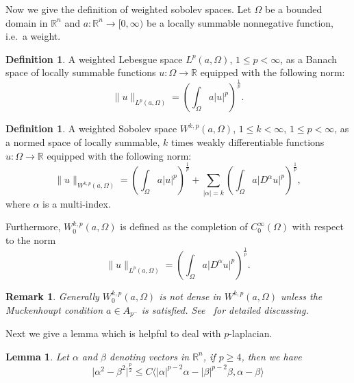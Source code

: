 \documentclass[11pt]{amsart}
\newtheorem{lemma}[theorem]{Lemma}
\newtheorem{remark}[theorem]{Remark}
\theoremstyle{definition}
\newtheorem{definition}[theorem]{Definition}
\numberwithin{equation}{section}
\newcommand*\abs[1]{\lvert#1\rvert}
\newcommand*\norm[1]{\lVert#1\rVert}
\newcommand\R{\mathbb{R}}
\begin{document}
Now we give the definition of weighted sobolev spaces.
Let $\Omega$ be a bounded domain in $\R^n$ and
$a \colon \R^n \to [0, \infty)$
be a locally summable nonnegative function, i.e.\ a weight.
\begin{definition}
	A weighted Lebesgue space $L^p(a, \Omega)$, $1 \leq p < \infty$,
	as a Banach space of locally summable functions
	$u \colon \Omega \to \R$ equipped with the following norm:
	\begin{equation}
		\norm{u}_{L^p(a,\Omega)} =
		\left( \int_{\Omega}a\abs{u}^p \right)^{\frac{1}{p}}.
	\end{equation}
\end{definition}
\begin{definition}
	A weighted Sobolev space $W^{k,p}(a,\Omega)$,
	$1 \leq k < \infty$, $1 \leq p < \infty$,
	as a normed space of locally summable, $k$ times weakly
	differentiable functions $u \colon \Omega \to \R$ equipped with the following norm:
	\begin{equation}
		\norm{u}_{W^{k,p}(a,\Omega)} =
		\left( \int_{\Omega}a\abs{u}^p \right)^{\frac{1}{p}}
		+ \sum_{\abs{\alpha}=k}
		\left( \int_{\Omega}a\abs{D^{\alpha}u}^p \right)^{\frac{1}{p}},
	\end{equation}
	where $\alpha$ is a multi-index.
	
	Furthermore,
	$W_0^{k,p}(a,\Omega)$ is defined as the completion of
	$C_0^{\infty}(\Omega)$ with respect to the norm
	\begin{equation}
		\norm{u}_{L^p(a,\Omega)} =
		\left( \int_{\Omega}a\abs{D^{\alpha}u}^p \right)^{\frac{1}{p}}.
	\end{equation}
\end{definition}
\begin{remark}
	Generally $W_0^{k,p}(a,\Omega)$ is not dense in
	$W^{k,p}(a,\Omega)$ unless the Muckenhoupt condition $a \in A_{p^-}$ is satisfied. See~\cite{goldshteinWeightedSobolevSpaces2009} for detailed discussing.
\end{remark}
Next we give a lemma which is helpful to deal with $p$-laplacian.
\begin{lemma}\label{lem:VecIneq}
	Let $\alpha$ and $\beta$ denoting vectors in $\R^{n}$, if $p \geq 4$, then we have
	\begin{equation}
		\abs{\alpha^2 - \beta^2}^{\frac{p}{2}}
		\leq C \langle \abs{\alpha}^{p-2}\alpha - \abs{\beta}^{p-2}\beta, \alpha-\beta\rangle
	\end{equation}
\end{lemma}
\end{document}

